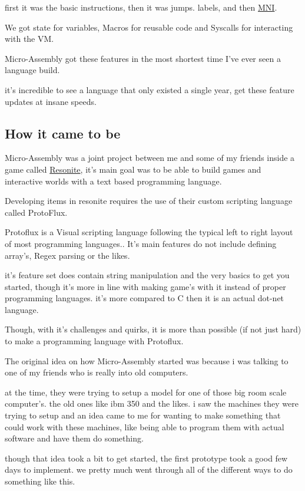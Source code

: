 \documentclass[a4paper,11pt]{book}
\begin{document}
first it was the basic instructions, then it was jumps.
labels, and then \hyperref[subpar:MNI]{MNI}.

We got state for variables, Macros for reusable code and Syscalls for interacting with
the VM.

Micro-Assembly got these features in the most shortest time I've ever seen a language build.

it's incredible to see a language that only existed a single year, get these feature updates
at insane speeds.


\subsection{How it came to be}
Micro-Assembly was a joint project between me and some of my friends inside a game called
\hyperref{https://resonite.com}{}{}{Resonite}, it's main goal was to be able to build games and interactive 
worlds with a text based programming language.

Developing items in resonite requires the use of their custom scripting language called ProtoFlux.

Protoflux is a Visual scripting language following the typical left to right layout of most programming languages..
It's main features do not include defining array's, Regex parsing or the likes.

it's feature set does contain string manipulation and the very basics to get you started,
though it's more in line with making game's with it instead of proper programming languages.
it's more compared to C then it is an actual dot-net language.

Though, with it's challenges and quirks, it is more than possible (if not just hard) to make a programming language with Protoflux.

The original idea on how Micro-Assembly started was because i was talking to one of my friends who is really into old computers.

at the time, they were trying to setup a model for one of those big room scale computer's.
the old ones like ibm 350 and the likes.
i saw the machines they were trying to setup and an idea came to me for wanting to make something that could
work with these machines, like being able to program them with actual software and have them do something.

though that idea took a bit to get started, the first prototype took a good few days to implement.
we pretty much went through all of the different ways to do something like this. 
\end{document}
